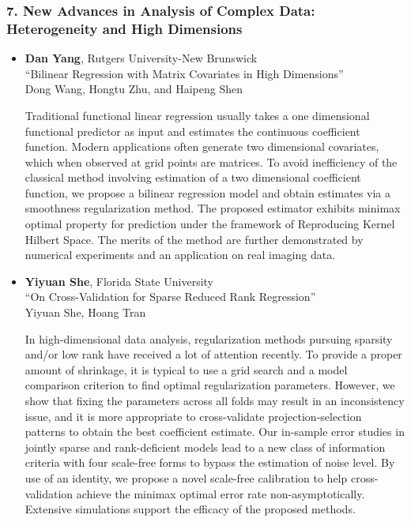 \subsubsection*{7. New Advances in Analysis of Complex Data: Heterogeneity and High Dimensions}

\begin{itemize}
\item \textbf{Dan Yang}, Rutgers University-New Brunswick \\
``Bilinear Regression with Matrix Covariates in High Dimensions'' \\
Dong Wang, Hongtu Zhu, and Haipeng Shen


Traditional functional linear regression usually takes a one dimensional functional predictor as input and estimates the continuous coefficient function. Modern applications often generate two dimensional covariates, which when observed at grid points are matrices. To avoid inefficiency of the classical method involving estimation of a two dimensional coefficient function, we propose a bilinear regression model and obtain estimates via a smoothness regularization method. The proposed estimator exhibits minimax optimal property for prediction under the framework of Reproducing Kernel Hilbert Space. The merits of the method are further demonstrated by numerical experiments and an application on real imaging data. 

\item \textbf{Yiyuan She}, Florida State University \\
``On Cross-Validation for Sparse Reduced Rank Regression'' \\
Yiyuan She, Hoang Tran


In high-dimensional data analysis, regularization methods pursuing sparsity and/or low rank have received a lot of attention recently.  To provide a proper amount of shrinkage, it is typical to use a grid search and a model comparison criterion to find optimal regularization parameters. However, we show that fixing the parameters   across all folds may result in an inconsistency issue, and  it is more appropriate to cross-validate projection-selection patterns to obtain the best coefficient estimate. Our     in-sample error studies in jointly sparse and rank-deficient models lead to a new class of information criteria with four scale-free forms to bypass the estimation of  noise level. By use of an identity, we propose a novel scale-free  calibration to help cross-validation achieve the minimax optimal error rate non-asymptotically. Extensive simulations support the efficacy of the proposed methods.

\end{itemize}

